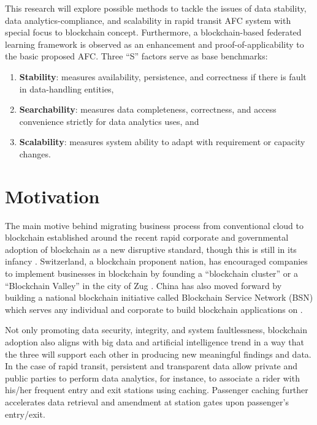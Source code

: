 \documentclass[a4paper,12pt,oneside, utf8x]{report}
\begin{document}

This research will explore possible methods to tackle the issues of data stability, data analytics-compliance, and scalability in rapid transit AFC system with special focus to blockchain concept. Furthermore, a blockchain-based federated learning framework is observed as an enhancement and proof-of-applicability to the basic proposed AFC. Three ``S'' factors serve as base benchmarks:
\begin{enumerate}
\item \textbf{Stability}: measures availability, persistence, and correctness if there is fault in data-handling entities,
\item \textbf{Searchability}: measures data completeness, correctness, and access convenience strictly for data analytics uses, and
\item \textbf{Scalability}: measures system ability to adapt with requirement or capacity changes.
\end{enumerate}

\section{Motivation}
\label{smotiv}
The main motive behind migrating business process from conventional cloud to blockchain established around the recent rapid corporate and governmental adoption of blockchain as a new disruptive standard, though this is still in its infancy \cite{y41}. Switzerland, a blockchain proponent nation, has encouraged companies to implement businesses in blockchain by founding a ``blockchain cluster'' or a ``Blockchain Valley'' in the city of Zug \cite{y42}. China has also moved forward by building a national blockchain initiative called Blockchain Service Network (BSN) which serves any individual and corporate to build blockchain applications on \cite{y8}.

Not only promoting data security, integrity, and system faultlessness, blockchain adoption also aligns with big data and artificial intelligence trend in a way that the three will support each other in producing new meaningful findings and data. In the case of rapid transit, persistent and transparent data allow private and public parties to perform data analytics, for instance, to associate a rider with his/her frequent entry and exit stations using caching. Passenger caching further accelerates data retrieval and amendment at station gates upon passenger's entry/exit.
\end{document}
